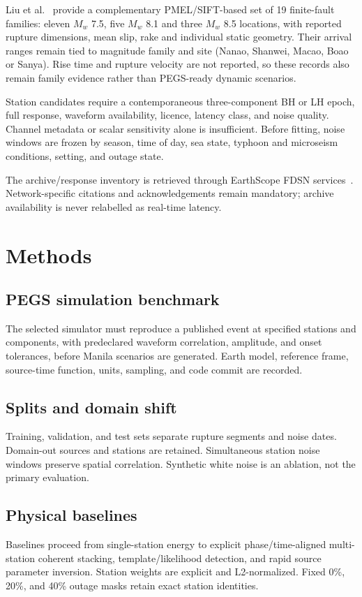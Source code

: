 \documentclass[11pt]{article}
\begin{document}
Liu et al.~\cite{Liu2023} provide a complementary PMEL/SIFT-based set of
19 finite-fault families: eleven $M_w$ 7.5, five $M_w$ 8.1 and three $M_w$ 8.5
locations, with reported rupture dimensions, mean slip, rake and individual
static geometry. Their arrival ranges remain tied to magnitude family and site
(Nanao, Shanwei, Macao, Boao or Sanya). Rise time and rupture velocity are not
reported, so these records also remain family evidence rather than PEGS-ready
dynamic scenarios.

Station candidates require a contemporaneous three-component BH or LH epoch,
full response, waveform availability, licence, latency class, and noise quality.
Channel metadata or scalar sensitivity alone is insufficient. Before fitting,
noise windows are frozen by season, time of day, sea state, typhoon and
microseism conditions, setting, and outage state.

The archive/response inventory is retrieved through EarthScope FDSN
services~\cite{EarthScopeFDSN}. Network-specific citations and acknowledgements
remain mandatory; archive availability is never relabelled as real-time latency.

\section{Methods}
\subsection{PEGS simulation benchmark}
The selected simulator must reproduce a published event at specified stations
and components, with predeclared waveform correlation, amplitude, and onset
tolerances, before Manila scenarios are generated. Earth model, reference frame,
source-time function, units, sampling, and code commit are recorded.

\subsection{Splits and domain shift}
Training, validation, and test sets separate rupture segments and noise dates.
Domain-out sources and stations are retained. Simultaneous station noise windows
preserve spatial correlation. Synthetic white noise is an ablation, not the
primary evaluation.

\subsection{Physical baselines}
Baselines proceed from single-station energy to explicit phase/time-aligned
multi-station coherent stacking, template/likelihood detection, and rapid source
parameter inversion. Station weights are explicit and L2-normalized. Fixed 0\%,
20\%, and 40\% outage masks retain exact station identities.
\end{document}
